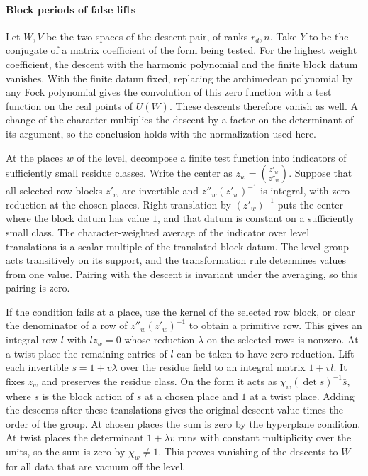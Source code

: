 \paragraph{Block periods of false lifts}\label{par:false-lift-periods}
Let \(W,V\) be the two spaces of the descent pair, of ranks \(r_d,n\).
Take \(Y\) to be the conjugate of a matrix coefficient of the form being
tested. For the highest weight coefficient, the descent with the harmonic
polynomial and the finite block datum vanishes. With the finite datum fixed,
replacing the archimedean polynomial by any Fock polynomial gives the
convolution of this zero function with a test function on the real points
of \(U(W)\). These descents therefore vanish as well. A change of the
character multiplies the descent by a factor on the determinant of its
argument, so the conclusion holds with the normalization used here.

At the places \(w\) of the level, decompose a finite test function into
indicators of sufficiently small residue classes. Write the center as
\(z_w=\binom{z'_w}{z''_w}\). Suppose that all selected row blocks \(z'_w\)
are invertible and \(z''_w(z'_w)^{-1}\) is integral, with zero reduction at
the chosen places. Right translation by \((z'_w)^{-1}\) puts the center
where the block datum has value \(1\), and that datum is constant on a
sufficiently small class. The character-weighted average of the indicator
over level translations is a scalar multiple of the translated block
datum. The level group acts transitively on its support, and the
transformation rule determines values from one value. Pairing with the
descent is invariant under the averaging, so this pairing is zero.

If the condition fails at a place, use the kernel of the selected row block,
or clear the denominator of a row of \(z''_w(z'_w)^{-1}\) to obtain a
primitive row. This gives an integral row \(l\) with \(lz_w=0\) whose
reduction \(\lambda\) on the selected rows is nonzero. At a twist place
the remaining entries of \(l\) can be taken to have zero reduction. Lift
each invertible \(s=1+v\lambda\) over the residue field to an integral
matrix \(1+\widetilde v l\). It fixes \(z_w\) and preserves the residue
class. On the form it acts as \(\chi_w(\det s)^{-1}\bar s\), where
\(\bar s\) is the block action of \(s\) at a chosen place and \(1\) at a
twist place. Adding the descents after these translations gives the
original descent value times the order of the group. At chosen places
the sum is zero by the hyperplane condition. At twist places the
determinant \(1+\lambda v\) runs with constant multiplicity over the
units, so the sum is zero by \(\chi_w\ne1\). This proves vanishing of the
descents to \(W\) for all data that are vacuum off the level.

